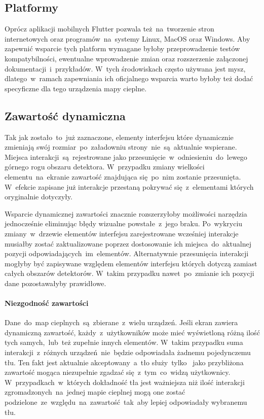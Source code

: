 \subsection{Platformy}
Oprócz aplikacji mobilnych Flutter pozwala też~na~tworzenie stron internetowych oraz programów~na~systemy Linux, MacOS oraz Windows. Aby zapewnić wsparcie tych platform wymagane byłoby przeprowadzenie testów kompatybilności, ewentualne wprowadzenie zmian oraz rozszerzenie załączonej dokumentacji~i~przykładów. W~tych środowiskach często używana jest mysz, dlatego~w~ramach zapewniania ich oficjalnego wsparcia warto byłoby też dodać specyficzne dla tego urządzenia mapy cieplne.

\subsection{Zawartość dynamiczna}
Tak jak zostało~to~już zaznaczone, elementy interfejsu które dynamicznie zmieniają swój rozmiar~po~załadowniu strony~nie~są~aktualnie wspierane. Miejsca interakcji~są~rejestrowane jako przesunięcie~w~odniesieniu~do~lewego górnego rogu obszaru detektora. W~przypadku zmiany wielkości elementu~na~ekranie zawartość znajdująca się~po~nim zostanie przesunięta. W~efekcie zapisane już interakcje przestaną pokrywać się~z~elementami których oryginalnie dotyczyły. 

Wsparcie dynamicznej zawartości znacznie rozszerzyłoby możliwości narzędzia jednocześnie eliminując błędy wizualne powstałe~z~jego braku. Po~wykryciu zmiany~w~drzewie elementów interfejsu zarejestrowane wcześniej interakcje musiałby zostać zaktualizowane poprzez dostosowanie ich miejsca~do~aktualnej pozycji odpowiadających~im~elementów. Alternatywnie przesunięcia interakcji mogłyby być zapisywane względem elementów interfejsu których dotyczą zamiast całych obszarów detektorów. W~takim przypadku nawet~po~zmianie ich pozycji dane pozostawałyby prawidłowe.

\paragraph{Niezgodność zawartości}
Dane~do~map cieplnych~są~zbierane~z~wielu urządzeń. Jeśli ekran zawiera dynamiczną zawartość, każdy~z~użytkowników może mieć wyświetloną różną ilość tych samych,~lub~też zupełnie innych elementów. W~takim przypadku suma interakcji~z~różnych urządzeń~nie~będzie odpowiadała żadnemu pojedynczemu tłu. Ten fakt jest aktualnie akceptowany~a~tło służy~tylko~ jako przybliżona zawartość mogąca niezupełnie zgadzać się~z~tym~co~widzą użytkownicy. W~przypadkach~w~których dokładność tła jest ważniejsza niż ilość interakcji zgromadzonych~na~jednej mapie cieplnej mogą one zostać podzielone~ze~względu~na~zawartość~tak~aby lepiej odpowiadały wybranemu tłu.

